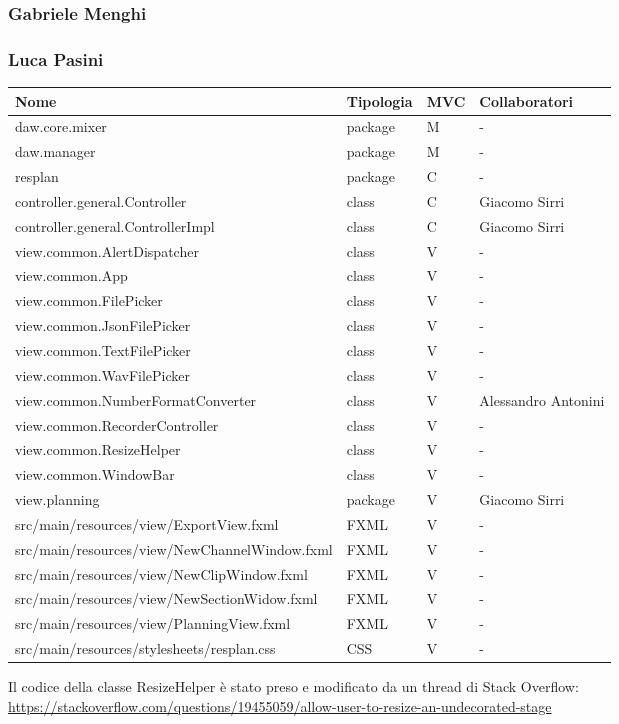 \documentclass[a4paper,12pt]{report}
\begin{document}
\subsubsection{Gabriele Menghi}

\endsubsubsection
\subsubsection{Luca Pasini}
\begin{center}
\begin{longtable}{| m{23em} | m{1.5cm}| m{1cm} | m{2.5cm} |} 
 \hline
  Nome & Tipologia & MVC & Collaboratori \\ [0.5ex] 
\hline
daw.core.mixer & package & M & - \\
\hline
daw.manager & package & M & - \\
\hline
resplan & package & C & - \\
\hline
controller.general.Controller & class & C & Giacomo Sirri \\
\hline
controller.general.ControllerImpl & class & C & Giacomo Sirri \\
\hline
view.common.AlertDispatcher & class & V & - \\
\hline
view.common.App & class & V & - \\
\hline
view.common.FilePicker & class & V & - \\
\hline
view.common.JsonFilePicker & class & V & - \\
\hline
view.common.TextFilePicker & class & V & - \\
\hline
view.common.WavFilePicker & class & V & - \\
\hline 
view.common.NumberFormatConverter & class & V & Alessandro Antonini \\
\hline
view.common.RecorderController & class & V & - \\
\hline
view.common.ResizeHelper & class & V & - \\
\hline
view.common.WindowBar & class & V & - \\
\hline
view.planning & package & V & Giacomo Sirri \\
\hline
src/main/resources/view/ExportView.fxml & FXML & V & - \\
\hline
src/main/resources/view/NewChannelWindow.fxml & FXML & V & - \\
\hline
src/main/resources/view/NewClipWindow.fxml & FXML & V & - \\
\hline
src/main/resources/view/NewSectionWidow.fxml & FXML & V & - \\
\hline
src/main/resources/view/PlanningView.fxml & FXML & V & - \\
\hline
src/main/resources/stylesheets/resplan.css & CSS & V & - \\
\hline
\end{longtable}
\end{center}
Il codice della classe ResizeHelper è stato preso e modificato da un thread di Stack Overflow: 
\hyperlink{https://stackoverflow.com/questions/19455059/allow-user-to-resize-an-undecorated-stage}{https://stackoverflow.com/questions/19455059/allow-user-to-resize-an-undecorated-stage}
\endsubsubsection
\end{document}
